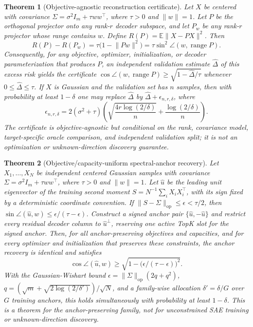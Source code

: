 \documentclass{article}
\theoremstyle{plain}
\newtheorem{theorem}{Theorem}
\begin{document}
\begin{theorem}[Objective-agnostic reconstruction certificate]
\label{thm:certificate}
Let $X$ be centered with covariance $\Sigma=\sigma^2 I_m+\tau ww^{\top}$, where $\tau>0$ and $\lVert w\rVert=1$. Let $P$ be the orthogonal projector onto any rank-$r$ decoder subspace, and let $P_w$ be any rank-$r$ projector whose range contains $w$. Define $R(P)=\mathbb{E}\lVert X-PX\rVert^2$. Then
\begin{equation}
R(P)-R(P_w)=\tau\bigl(1-\lVert Pw\rVert^2\bigr)=\tau\sin^2\!\angle(w,\operatorname{range}P).
\end{equation}
Consequently, for any objective, optimizer, initialization, or decoder parameterization that produces $P$, an independent validation estimate $\widehat\Delta$ of this excess risk yields the certificate $\cos\angle(w,\operatorname{range}P)\ge\sqrt{1-\widehat\Delta/\tau}$ whenever $0\le\widehat\Delta\le\tau$. If $X$ is Gaussian and the validation set has $n$ samples, then with probability at least $1-\delta$ one may replace $\widehat\Delta$ by $\widehat\Delta+\epsilon_{n,r,\delta}$, where
\begin{equation}
\epsilon_{n,r,\delta}=2(\sigma^2+\tau)\left(\sqrt{\frac{4r\log(2/\delta)}{n}}+\frac{\log(2/\delta)}{n}\right).
\end{equation}
The certificate is objective-agnostic but conditional on the rank, covariance model, target-specific oracle comparison, and independent validation split; it is not an optimization or unknown-direction discovery guarantee.
\end{theorem}

\begin{theorem}[Objective/capacity-uniform spectral-anchor recovery]
\label{thm:spectral_anchor}
Let $X_1,\ldots,X_N$ be independent centered Gaussian samples with covariance $\Sigma=\sigma^2 I_m+\tau ww^{\top}$, where $\tau>0$ and $\lVert w\rVert=1$. Let $\widehat u$ be the leading unit eigenvector of the training second moment $S=N^{-1}\sum_i X_iX_i^{\top}$, with its sign fixed by a deterministic coordinate convention. If $\lVert S-\Sigma\rVert_{\mathrm{op}}\le\epsilon<\tau/2$, then $\sin\angle(\widehat u,w)\le\epsilon/(\tau-\epsilon)$. Construct a signed anchor pair $\{\widehat u,-\widehat u\}$ and restrict every residual decoder column to $\widehat u^\perp$, reserving one active TopK slot for the signed anchor. Then, for all anchor-preserving objectives and capacities, and for every optimizer and initialization that preserves these constraints, the anchor recovery is identical and satisfies\[\cos\angle(\widehat u,w)\ge\sqrt{1-\bigl(\epsilon/(\tau-\epsilon)\bigr)^2}.\] With the Gaussian-Wishart bound $\epsilon=\|\Sigma\|_{\mathrm{op}}(2q+q^2)$, $q=(\sqrt m+\sqrt{2\log(2/\delta')})/\sqrt N$, and a family-wise allocation $\delta'=\delta/G$ over $G$ training anchors, this holds simultaneously with probability at least $1-\delta$. This is a theorem for the anchor-preserving family, not for unconstrained SAE training or unknown-direction discovery.\end{theorem}
\end{document}
